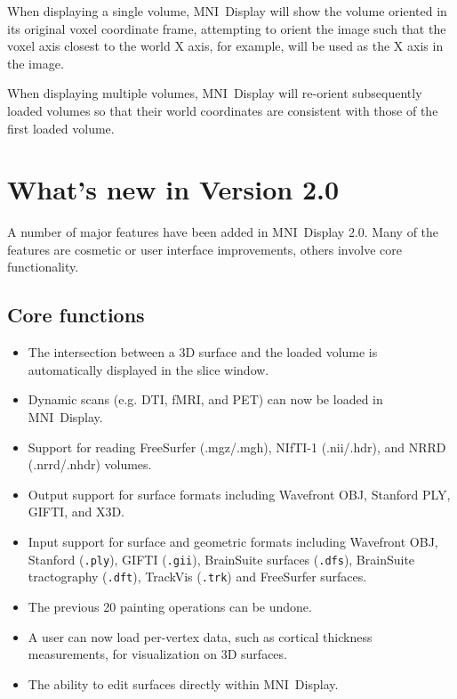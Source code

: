 \documentclass[11pt,letterpaper]{article}
\newcommand{\ident}[1]{{\tt #1}}
\newcommand{\display}{\mbox{MNI Display}}
\begin{document}
When displaying a single volume, \display{} will show the volume
oriented in its original voxel coordinate frame, attempting to orient
the image such that the voxel axis closest to the world X axis, for
example, will be used as the X axis in the image.

When displaying multiple volumes, \display{} will re-orient subsequently
loaded volumes so that their world coordinates are consistent with
those of the first loaded volume.

\section{What's new in Version 2.0}

A number of major features have been added in \display{} 2.0. Many of
the features are cosmetic or user interface improvements, others
involve core functionality.

\subsection{Core functions}
\begin{itemize}
\item The intersection between a 3D surface and the loaded volume is automatically displayed in the slice window.
\item Dynamic scans (e.g. DTI, fMRI, and PET) can now be loaded in \display{}.
\item Support for reading FreeSurfer (.mgz/.mgh), NIfTI-1 (.nii/.hdr), and
  NRRD (.nrrd/.nhdr) volumes.
\item Output support for surface formats including Wavefront OBJ,
  Stanford PLY, GIFTI, and X3D.
\item Input support for surface and geometric formats including
  Wavefront OBJ, Stanford (\ident{.ply}), GIFTI (\ident{.gii}),
  BrainSuite surfaces (\ident{.dfs}), BrainSuite tractography
  (\ident{.dft}), TrackVis (\ident{.trk}) and FreeSurfer surfaces.
\item The previous 20 painting operations can be undone.
\item A user can now load per-vertex data, such as cortical thickness
  measurements, for visualization on 3D surfaces.
\item The ability to edit surfaces directly within \display{}.
\end{itemize}
\end{document}
